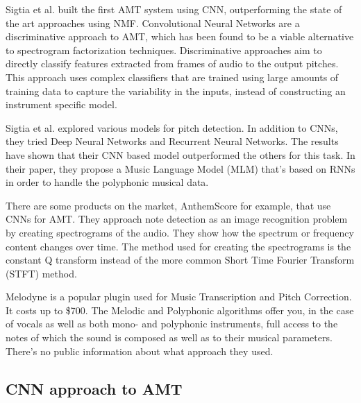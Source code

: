 Sigtia et al.\cite{REF:10} built the first AMT system using CNN, outperforming the state of the art approaches using NMF. Convolutional
Neural Networks are a discriminative approach to AMT, which has been found to be a
viable alternative to spectrogram factorization techniques. Discriminative approaches
aim to directly classify features extracted from frames of audio to the output pitches.
This approach uses complex classifiers that are trained using large amounts of training
data to capture the variability in the inputs, instead of constructing an instrument
specific model. 
\par

Sigtia et al. \cite{REF:10} explored various models for pitch detection. In addition to CNNs, they tried Deep Neural Networks and Recurrent Neural Networks. The results have shown that their CNN based model outperformed the others for this task. In their paper, they propose a Music Language Model (MLM) that's based on RNNs in order to handle the polyphonic musical data. \cite{benetos}
\par

There are some products on the market, AnthemScore for example, that use CNNs for AMT. They approach note detection as an image recognition problem by creating spectrograms of the audio. They show how the spectrum or frequency content changes over time. The method used for creating the spectrograms is the constant Q transform instead of the more common Short Time Fourier Transform (STFT) method.
\par

Melodyne is a popular plugin used for Music Transcription and Pitch Correction. It costs up to \$700. 	
The Melodic and Polyphonic algorithms offer you, in the case of vocals as well as both mono- and polyphonic instruments, full access to the notes of which the sound is composed as well as to their musical parameters.
There's no public information about what approach they used.
\par

\subsection{CNN approach to AMT}


